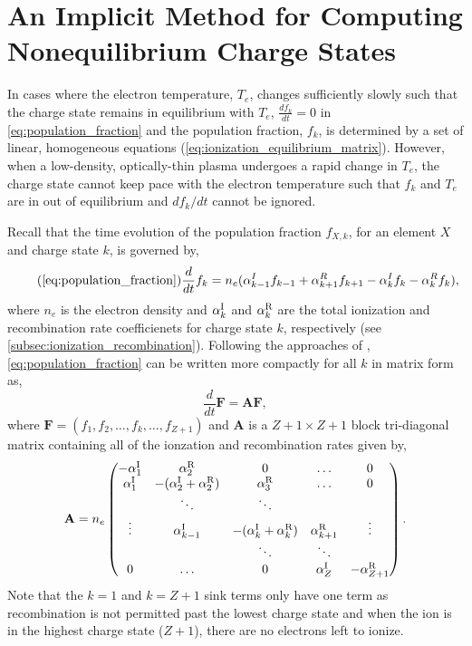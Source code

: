 \chapter{An Implicit Method for Computing Nonequilibrium Charge States}\label{ap:nonequilibrium_implicit}

 In cases where the electron temperature, $T_e$, changes sufficiently slowly such that the charge state remains in equilibrium with $T_e$, $\frac{df_k}{dt}=0$ in \autoref{eq:population_fraction} and the population fraction, $f_k$, is determined by a set of linear, homogeneous equations (\autoref{eq:ionization_equilibrium_matrix}). However, when a low-density, optically-thin plasma undergoes a rapid change in $T_e$, the charge state cannot keep pace with the electron temperature such that $f_k$ and $T_e$ are in out of equilibrium and $df_k/dt$ cannot be ignored. 
 
 Recall that the time evolution of the population fraction $f_{X,k}$, for an element $X$ and charge state $k$, is governed by,
 \begin{equation*}\tag{\ref{eq:population_fraction}}
     \frac{d}{dt}f_k = n_e(\alpha_{k-1}^I f_{k-1} + \alpha_{k+1}^R f_{k+1} - \alpha_{k}^I f_k - \alpha_k^R f_k),
 \end{equation*}
 where $n_e$ is the electron density and $\alpha^\textup{I}_k$ and $\alpha^\textup{R}_k$ are the total ionization and recombination rate coefficienets for charge state $k$, respectively (see \autoref{subsec:ionization_recombination}). Following the approaches of \citet{masai_x-ray_1984,hughes_self-consistent_1985}, \autoref{eq:population_fraction} can be written more compactly for all $k$ in matrix form as,
 \begin{equation}\label{eq:population_fraction_matrix}
     \frac{d}{dt}\mathbf{F} = \mathbf{A}\mathbf{F},
 \end{equation}
 where $\mathbf{F}=(f_1,f_2,\ldots,f_k,\ldots,f_{Z+1})$ and $\mathbf{A}$ is a $Z+1{\times}Z+1$ block tri-diagonal matrix containing all of the ionzation and recombination rates given by,
 \begin{equation}\label{eq:rate_matrix}
    \mathbf{A} = n_e
        \begin{pmatrix}
            -\alpha^\textup{I}_1 & \alpha^\textup{R}_2 & 0 & \dots & 0 \\
            \alpha^\textup{I}_1 & -(\alpha^\textup{I}_2 + \alpha^\textup{R}_2) & \alpha^\textup{R}_3 & \dots & 0 \\
             & \ddots & \ddots & &  \\
            \vdots & \alpha^\textup{I}_{k-1} & -(\alpha^\textup{I}_k + \alpha^\textup{R}_k) & \alpha^\textup{R}_{k+1} & \vdots \\
             & & \ddots & \ddots & \\
            0 & \dots & 0 & \alpha^\textup{I}_{Z} & -\alpha^\textup{R}_{Z+1} 
        \end{pmatrix}.
\end{equation}
Note that the $k=1$ and $k=Z+1$ sink terms only have one term as recombination is not permitted past the lowest charge state and when the ion is in the highest charge state ($Z+1$), there are no electrons left to ionize.

